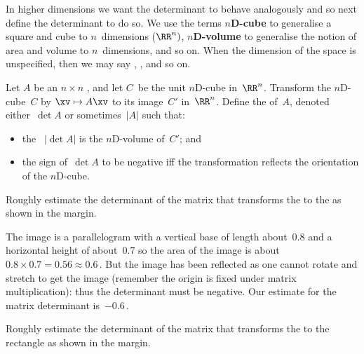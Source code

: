 In higher dimensions we want the determinant to behave analogously and so next define the determinant to do so.
We use the terms \textbf{$n$D-cube} to generalise a square and cube to \(n\)~dimensions (\(\RR^n)\), \textbf{$n$D-volume} to generalise the notion of area and volume to \(n\)~dimensions, and so on.
When the dimension of the space is unspecified, then we may say , , and so on.


\begin{definition} \label{def:detarea} 
Let \(A\) be an \(n\times n\) , and let \(C\)~be the unit $n$D-cube in~\(\RR^n\).
Transform the \(n\)D-cube~\(C\) by \(\xv\mapsto A\xv\)\index{$\mapsto$} to its image~\(C'\) in~\(\RR^n\). 
Define the  of~\(A\), denoted either~\(\det A\) or sometimes~\(|A|\) such that:  \begin{itemize}
\item the ~\(|\det A|\) is the $n$D-volume of~\(C'\); and 
\item the sign of~\(\det A\) to be negative iff the transformation reflects the orientation of the $n$D-cube.
\end{itemize}
\end{definition}




\begin{example} \label{eg:}
Roughly estimate the determinant of the matrix that transforms the  to the  as shown in the margin.
\begin{solution} 
The image is a parallelogram with a vertical base of length about~\(0.8\) and a horizontal height of about~\(0.7\) so the area of the image is about~\(0.8\times0.7=0.56\approx 0.6\)\,.
But the image has been reflected as one cannot rotate and stretch to get the image (remember the origin is fixed under matrix multiplication): thus the determinant must be negative.
Our estimate for the matrix determinant is~\(-0.6\)\,.
\end{solution}
\end{example}



\begin{activity}
Roughly estimate the determinant of the matrix that transforms the  to the rectangle as shown in the margin.
\end{activity}




